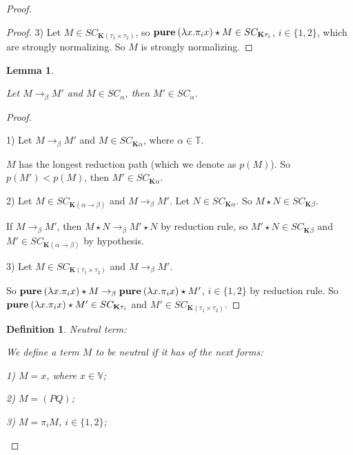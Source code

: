 \documentclass[a4paper]{article}
\newtheorem{lemma}{Lemma}
\newtheorem{defin}{Definition}
\begin{document}
\begin{proof}
\begin{proof}
  3) Let $M \in SC_{\textbf{K}(\tau_1 \times \tau_2)}$, so ${\bf pure \:} (\lambda x. \pi_i x) \star M \in
  SC_{\textbf{K}\tau_i}$, $i \in \{ 1,2 \}$, which are strongly normalizing. So $M$ is
  strongly normalizing.

  \end{proof}


  \begin{lemma}

  $ $

  Let $M \rightarrow_{\beta} M'$ and $M \in SC_{\alpha}$, then $M' \in SC_{\alpha}$.

  \end{lemma}


  \begin{proof}

$ $

  1) Let $M \rightarrow_{\beta} M'$ and $M \in SC_{\textbf{K}\alpha}$, where $\alpha \in \mathbb{T}$.

  $M$ has the longest reduction path (which we denote as $p(M)$). So $p(M') < p(M)$, then $M' \in SC_{\textbf{K}\alpha}$.

  2) Let $M \in SC_{\textbf{K}(\alpha \to \beta)}$ and $M \rightarrow_{\beta} M'$. Let $N \in
  SC_{\textbf{K}\alpha}$. So $M \star N \in SC_{\textbf{K}\beta}$.

  If $M \rightarrow_{\beta} M'$, then $M \star N \rightarrow_{\beta} M' \star N$ by reduction
  rule, so $M' \star N \in SC_{\textbf{K}\beta}$ and $M' \in SC_{\textbf{K}(\alpha \to \beta)}$ by
  hypothesis.

  3) Let $M \in SC_{\textbf{K}(\tau_1 \times \tau_2)}$ and $M \rightarrow_{\beta} M'$.

  So ${\bf pure \: } (\lambda x. \pi_i x) \star M \rightarrow_{\beta} {\bf pure \: } (\lambda x. \pi_i x)
  \star M'$, $i \in \{ 1, 2 \}$ by reduction rule. So ${\bf pure \: } (\lambda x. \pi_i x) \star M' \in
  SC_{\textbf{K} \tau_i }$ and $M' \in SC_{\textbf{K}(\tau_1 \times \tau_2)}$.

  \end{proof}

  \begin{defin} Neutral term:

  We define a term $M$ to be neutral if it has of the next forms:

  1) $M = x$, where $x \in \mathbb{V}$;

  2) $M = (P Q)$;

  3) $M = \pi_i M$, $i \in \{ 1,2 \}$;


\end{defin}
\end{proof}
\end{document}
